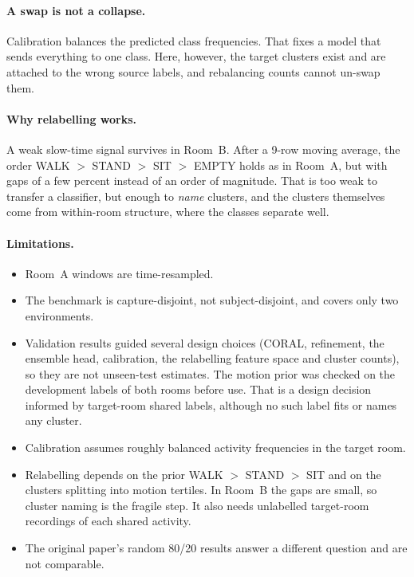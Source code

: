 \documentclass[11pt,a4paper]{article}
\begin{document}
\paragraph{A swap is not a collapse.} Calibration balances the predicted class frequencies. That fixes a model that sends everything to one class. Here, however, the target clusters exist and are attached to the wrong source labels, and rebalancing counts cannot un-swap them.

\paragraph{Why relabelling works.} A weak slow-time signal survives in Room~B. After a 9-row moving average, the order WALK $>$ STAND $>$ SIT $>$ EMPTY holds as in Room~A, but with gaps of a few percent instead of an order of magnitude. That is too weak to transfer a classifier, but enough to \emph{name} clusters, and the clusters themselves come from within-room structure, where the classes separate well.

\paragraph{Limitations.}
\begin{itemize}
  \item Room~A windows are time-resampled.
  \item The benchmark is capture-disjoint, not subject-disjoint, and covers only two environments.
  \item Validation results guided several design choices (CORAL, refinement, the ensemble head, calibration, the relabelling feature space and cluster counts), so they are not unseen-test estimates. The motion prior was checked on the development labels of both rooms before use. That is a design decision informed by target-room shared labels, although no such label fits or names any cluster.
  \item Calibration assumes roughly balanced activity frequencies in the target room.
  \item Relabelling depends on the prior WALK $>$ STAND $>$ SIT and on the clusters splitting into motion tertiles. In Room~B the gaps are small, so cluster naming is the fragile step. It also needs unlabelled target-room recordings of each shared activity.
  \item The original paper's random 80/20 results answer a different question and are not comparable.
\end{itemize}
\end{document}
